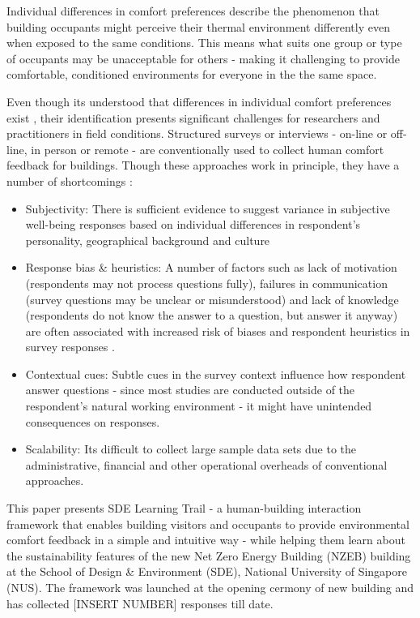 

Individual differences in comfort preferences describe the phenomenon that building occupants might perceive their thermal environment differently even when exposed to the same conditions. This means what suits one group or type of occupants may be unacceptable for others - making it challenging to provide comfortable, conditioned environments for everyone in the the same space.

Even though its understood that differences in individual comfort preferences exist \cite{WANG2018181}, their identification presents significant challenges for researchers and practitioners in field conditions. Structured surveys or interviews - on-line or off-line, in person or remote - are conventionally used to collect human comfort feedback for buildings. Though these approaches work in principle, they have a number of shortcomings \cite{organisationforeconomicco-operationanddevelopment(oecd)_2013}:  

\begin{itemize}
  \item Subjectivity: There is sufficient evidence to suggest variance in subjective well-being responses based on individual differences in respondent's personality, geographical background and culture \cite{doi:10.1146/annurev.psych.54.101601.145056}
  \item Response bias \& heuristics: A number of factors such as lack of motivation (respondents may not process questions fully), failures in communication (survey questions may be unclear or misunderstood) and lack of knowledge (respondents do not know the answer to a question, but answer it anyway) are often associated with increased risk of biases and respondent heuristics in survey responses \cite{bradburn2004asking}.
  \item Contextual cues: Subtle cues in the survey context influence how respondent answer questions \cite{krosnick1997seymour} - since most studies are conducted outside of the respondent's natural working environment - it might have unintended consequences on responses. 
  \item Scalability: Its difficult to collect large sample data sets due to the administrative, financial and other operational overheads of conventional approaches.
\end{itemize}


This paper presents SDE Learning Trail - a human-building interaction framework that enables building visitors and occupants to provide environmental comfort feedback in a simple and intuitive way - while helping them learn about the sustainability features of the new Net Zero Energy Building (NZEB) building at the School of Design \& Environment (SDE), National University of Singapore (NUS). The framework was launched at the opening cermony of new building and has collected [INSERT NUMBER] responses till date.\\


